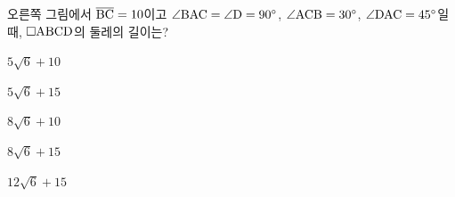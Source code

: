 \noindent\begin{minipage}[t]{0.58\linewidth}\vspace{0pt}\raggedright 오른쪽 그림에서 $\overline{\mathrm{BC}}=10$이고 $\angle\mathrm{BAC}=\angle\mathrm{D}=90^\circ$, $\angle\mathrm{ACB}=30^\circ$, $\angle\mathrm{DAC}=45^\circ$일 때, $\square\mathrm{ABCD}$의 둘레의 길이는?\end{minipage}\hfill\begin{minipage}[t]{0.4\linewidth}\vspace{0pt}\centering \resizebox{\ifdim\width>\linewidth\linewidth\else\width\fi}{!}{}\end{minipage}\par
\begin{choices32}{\rule[-3ex]{0pt}{8ex}$5\sqrt{6}+10$}{\rule[-3ex]{0pt}{8ex}$5\sqrt{6}+15$}{\rule[-3ex]{0pt}{8ex}$8\sqrt{6}+10$}{\rule[-3ex]{0pt}{8ex}$8\sqrt{6}+15$}{\rule[-3ex]{0pt}{8ex}$12\sqrt{6}+15$}\end{choices32}
